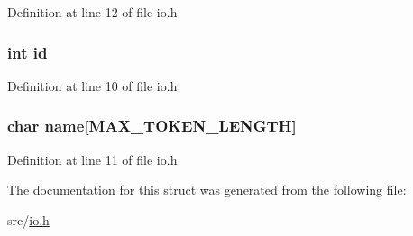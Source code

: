 Definition at line 12 of file io.h.

\hypertarget{structcommand_a7441ef0865bcb3db9b8064dd7375c1ea}{
\subsubsection[{id}]{\setlength{\rightskip}{0pt plus 5cm}int {\bf id}}}
\label{structcommand_a7441ef0865bcb3db9b8064dd7375c1ea}


Definition at line 10 of file io.h.

\hypertarget{structcommand_ac0b9897814a00cff684163a205d092b4}{
\subsubsection[{name}]{\setlength{\rightskip}{0pt plus 5cm}char {\bf name}\mbox{[}MAX\_\-TOKEN\_\-LENGTH\mbox{]}}}
\label{structcommand_ac0b9897814a00cff684163a205d092b4}


Definition at line 11 of file io.h.



The documentation for this struct was generated from the following file:\begin{DoxyCompactItemize}
\item 
src/\hyperlink{io_8h}{io.h}\end{DoxyCompactItemize}
